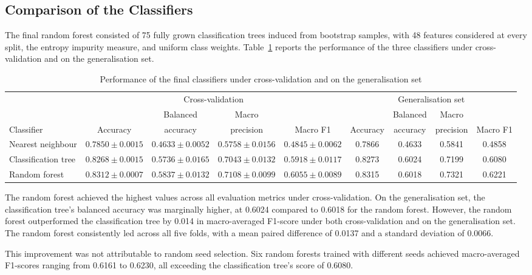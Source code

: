 \documentclass[conference]{IEEEtran}
\begin{document}
\subsection{Comparison of the Classifiers}

The final random forest consisted of 75 fully grown classification trees induced from bootstrap samples, with 48 features considered at every split, the entropy impurity measure, and uniform class weights. Table~\ref{tab:comparison} reports the performance of the three classifiers under cross-validation and on the generalisation set.

\begin{table}[!t]
\caption{Performance of the final classifiers under cross-validation and on the generalisation set}
\label{tab:comparison}
\centering
\begin{tabular}{@{}lcccccccc@{}}
\toprule
 & \multicolumn{4}{c}{Cross-validation} & \multicolumn{4}{c}{Generalisation set} \\
\cmidrule(lr){2-5}\cmidrule(l){6-9}
 & & Balanced & Macro & & & Balanced & Macro & \\
Classifier & Accuracy & accuracy & precision & Macro F1 & Accuracy & accuracy & precision & Macro F1 \\
\midrule
Nearest neighbour & $0.7850\pm0.0015$ & $0.4633\pm0.0052$ & $0.5758\pm0.0156$ & $0.4845\pm0.0062$ & 0.7866 & 0.4633 & 0.5841 & 0.4858 \\
Classification tree & $0.8268\pm0.0015$ & $0.5736\pm0.0165$ & $0.7043\pm0.0132$ & $0.5918\pm0.0117$ & 0.8273 & 0.6024 & 0.7199 & 0.6080 \\
Random forest & $0.8312\pm0.0007$ & $0.5837\pm0.0132$ & $0.7108\pm0.0099$ & $0.6055\pm0.0089$ & 0.8315 & 0.6018 & 0.7321 & 0.6221 \\
\bottomrule
\end{tabular}
\end{table}
The random forest achieved the highest values across all evaluation metrics under cross-validation. On the generalisation set, the classification tree's balanced accuracy was marginally higher, at 0.6024 compared to 0.6018 for the random forest. However, the random forest outperformed the classification tree by 0.014 in macro-averaged F1-score under both cross-validation and on the generalisation set. The random forest consistently led across all five folds, with a mean paired difference of 0.0137 and a standard deviation of 0.0066.

This improvement was not attributable to random seed selection. Six random forests trained with different seeds achieved macro-averaged F1-scores ranging from 0.6161 to 0.6230, all exceeding the classification tree's score of 0.6080.
\end{document}
